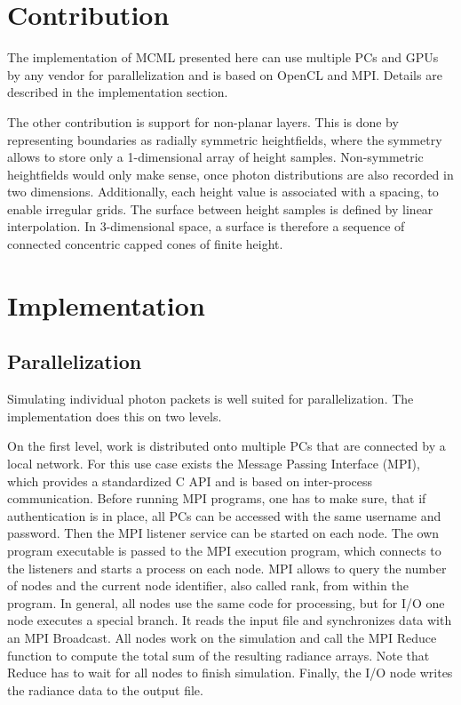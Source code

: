 \documentclass[]{article}
\begin{document}
\section{Contribution}

The implementation of MCML presented here can use multiple PCs and GPUs by any vendor for parallelization and is based on OpenCL and MPI. Details are described in the implementation section.

The other contribution is support for non-planar layers. This is done by representing boundaries as radially symmetric heightfields, where the symmetry allows to store only a 1-dimensional array of height samples. Non-symmetric heightfields would only make sense, once photon distributions are also recorded in two dimensions. Additionally, each height value is associated with a spacing, to enable irregular grids. The surface between height samples is defined by linear interpolation. In 3-dimensional space, a surface is therefore a sequence of connected concentric capped cones of finite height.

\section{Implementation}

\subsection{Parallelization}

Simulating individual photon packets is well suited for parallelization. The implementation does this on two levels.

On the first level, work is distributed onto multiple PCs that are connected by a local network. For this use case exists the Message Passing Interface (MPI), which provides a standardized C API and is based on inter-process communication. Before running MPI programs, one has to make sure, that if authentication is in place, all PCs can be accessed with the same username and password. Then the MPI listener service can be started on each node. The own program executable is passed to the MPI execution program, which connects to the listeners and starts a process on each node. MPI allows to query the number of nodes and the current node identifier, also called rank, from within the program. In general, all nodes use the same code for processing, but for I/O one node executes a special branch. It reads the input file and synchronizes data with an MPI Broadcast. All nodes work on the simulation and call the MPI Reduce function to compute the total sum of the resulting radiance arrays. Note that Reduce has to wait for all nodes to finish simulation. Finally, the I/O node writes the radiance data to the output file.
\end{document}
